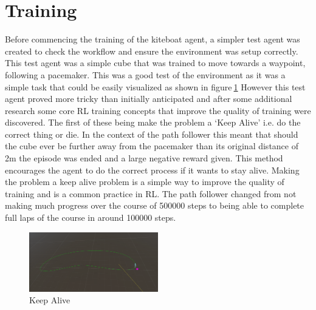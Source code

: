 \section{Training}\label{sec:training}
Before commencing the training of the kiteboat agent, a simpler test agent was created to check the workflow and ensure the environment was setup correctly. This test agent was a simple cube that was trained to move towards a waypoint, following a pacemaker. This was a good test of the environment as it was a simple task that could be easily visualized as shown in figure$~$\ref{pathFollower} However this test agent proved more tricky than initially anticipated and after some additional research some core RL training concepts that improve the quality of training were discovered. The first of these being make the problem a `Keep Alive' i.e. do the correct thing or die. In the context of the path follower this meant that should the cube ever be further away from the pacemaker than its original distance of 2m the episode was ended and a large negative reward given. This method encourages the agent to do the correct process if it wants to stay alive. Making the problem a keep alive problem is a simple way to improve the quality of training and is a common practice in RL. The path follower changed from not making much progress over the course of 500000 steps to being able to complete full laps of the course in around 100000 steps.

\begin{figure}[h]
    \centering
    \includegraphics[width=0.5\textwidth]{Images/practiceTraining.png}
    \caption{Keep Alive}\label{pathFollower}
\end{figure}

